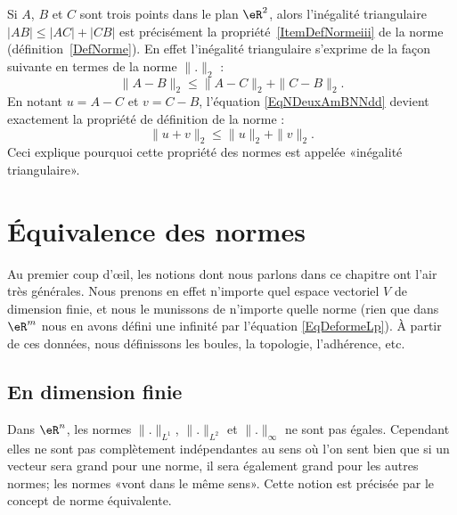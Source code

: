 \begin{remark}
	Si $A$, $B$ et $C$ sont trois points dans le plan $\eR^2$, alors l'inégalité triangulaire $| AB |\leq| AC |+| CB |$ est précisément la propriété~\ref{ItemDefNormeiii} de la norme (définition~\ref{DefNorme}). En effet l'inégalité triangulaire s'exprime de la façon suivante en termes de la norme $\| . \|_2$ :
	\begin{equation}	\label{EqNDeuxAmBNNdd}
		\| A-B \|_2\leq \| A-C \|_2+\| C-B \|_2.
	\end{equation}
	En notant $u=A-C$ et $v=C-B$, l'équation \eqref{EqNDeuxAmBNNdd} devient exactement la propriété de définition de la norme :
	\begin{equation}
		\| u+v \|_2\leq \| u \|_2+\| v \|_2.
	\end{equation}
	Ceci explique pourquoi cette propriété des normes est appelée «inégalité triangulaire».
\end{remark}


\section{Équivalence des normes}
\label{normes_equiv}

Au premier coup d'œil, les notions dont nous parlons dans ce chapitre ont l'air très générales. Nous prenons en effet n'importe quel espace vectoriel $V$ de dimension finie, et nous le munissons de n'importe quelle norme (rien que dans $\eR^m$ nous en avons défini une infinité par l'équation \eqref{EqDeformeLp}). À partir de ces données, nous définissons les boules, la topologie, l'adhérence, etc.

\subsection{En dimension finie}

Dans $\eR^n$, les normes $\| . \|_{L^1}$, $\| . \|_{L^2}$ et $\| . \|_{\infty}$ ne sont pas égales. Cependant elles ne sont pas complètement indépendantes au sens où l'on sent bien que si un vecteur sera grand pour une norme, il sera également grand pour les autres normes; les normes «vont dans le même sens». Cette notion est précisée par le concept de norme équivalente.

